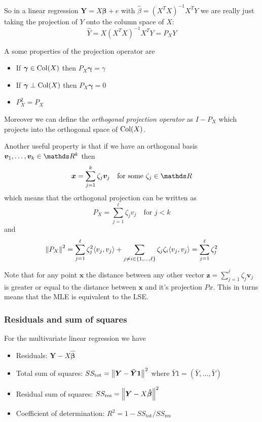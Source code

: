 \documentclass[12pt]{extarticle}
\renewcommand{\vec}[1]{\bm{#1}}
\begin{document}
So in a linear regression $\vec Y = X \vec \beta + e$ with $\hat \beta = (X^T X)^{-1} X^T Y$
we are really just taking the projection of $Y$ onto the column space of $X$:
\begin{equation}
	\hat Y = X (X^T X)^{-1} X^T Y = P_X Y
\end{equation}

A some properties of the projection operator are
\begin{itemize}
	\item If $\vec \gamma \in {\operatorfont Col}(X)$ then $P_X \vec \gamma = \gamma$
	\item If $\vec \gamma \perp{\operatorfont Col}(X)$ then $P_X \vec \gamma = 0$
	\item $P_X^2 = P_X$
\end{itemize}

Moreover we can define the \emph{orthogonal projection operator} as $I - P_X$
which projects into the orthogonal space of ${\operatorfont Col}(X)$.

Another useful property is that if we have an orthogonal basis $\vec v_1, \dots, \vec v_k \in \R^k$
then
\begin{equation}
	\vec x = \sum_{j = 1}^k \zeta_j \vec v_j \quad \text{for some } \zeta_j \in \R
\end{equation}
which means that the orthogonal projection can be written as
\begin{equation}
	P_X = \sum_{j = 1}^\ell \zeta_j v_j \quad \text{for } j < k
\end{equation}
and
\begin{equation}
	\norm{P_X}^2
	= \sum_{j = 1}^\ell \zeta_j ^2 \langle v_j, v_j \rangle + \sum_{j \neq i \in \{ 1, \dots, \ell \}} \zeta_j \zeta_i\langle v_j, v_j \rangle
	= \sum^\ell_{j = 1} \zeta_j^2
\end{equation}

Note that for any point $\vec x$ the distance between any other vector $\vec z = \sum_{j = 1}^\ell \zeta_j \vec v_j$
is greater or equal to the distance between $\vec x$ and it's projection $Px$.
This in turns means that the MLE is equivalent to the LSE.

\subsubsection{Residuals and sum of squares}

For the multivariate linear regression we have
\begin{itemize}
	\item Residuals: $\vec Y - X \vec{\hat \beta}$
	\item Total sum of squares: $SS_\text{tot} = \norm{\vec Y - \vec{\bar Y1}}^2$ where $\bar Y1 = (\bar Y, \dots, \bar Y)$
	\item Residual sum of squares: $SS_\text{res} = \norm{\vec Y - X \vec{\hat\beta}}^2$
	\item Coefficient of determination: $R^2 = 1 - SS_\text{tot}/ SS_\text{res}$
\end{itemize}
\end{document}
